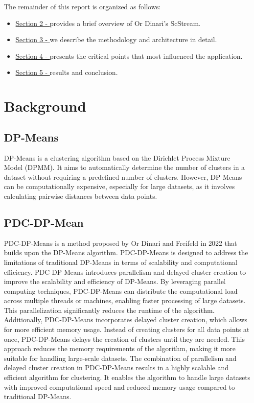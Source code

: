 \documentclass[12pt]{article}
\begin{document}
The remainder of this report is organized as follows:
    \begin{itemize}
        \item \underline{Section 2 - } provides a brief overview of Or Dinari's ScStream.
        \item \underline{Section 3 - } we describe the methodology and architecture in detail.
        \item \underline{Section 4 - } presents the critical points that most influenced the application.
        \item \underline{Section 5 - } results and conclusion.
    \end{itemize}

\pagebreak
    \section{Background}\label{sec:background}
        \subsection{DP-Means}\label{subsec:dpmeans}
DP-Means is a clustering algorithm based on the Dirichlet Process Mixture Model (DPMM).
It aims to automatically determine the number of clusters in a dataset without requiring a predefined number of clusters.
However, DP-Means can be computationally expensive, especially for large datasets, as it involves calculating pairwise distances between data points.
        \subsection{PDC-DP-Mean}\label{subsec:pdc}
PDC-DP-Means is a method proposed by Or Dinari and Freifeld in 2022 that builds upon the DP-Means algorithm.
PDC-DP-Means is designed to address the limitations of traditional DP-Means in terms of scalability and computational efficiency.
PDC-DP-Means introduces parallelism and delayed cluster creation to improve the scalability and efficiency of DP-Means.
By leveraging parallel computing techniques, PDC-DP-Means can distribute the computational load across multiple threads or machines, enabling faster processing of large datasets.
This parallelization significantly reduces the runtime of the algorithm.
Additionally, PDC-DP-Means incorporates delayed cluster creation, which allows for more efficient memory usage.
Instead of creating clusters for all data points at once, PDC-DP-Means delays the creation of clusters until they are needed.
This approach reduces the memory requirements of the algorithm, making it more suitable for handling large-scale datasets.
The combination of parallelism and delayed cluster creation in PDC-DP-Means results in a highly scalable and efficient algorithm for clustering.
It enables the algorithm to handle large datasets with improved computational speed and reduced memory usage compared to traditional DP-Means.
\end{document}
